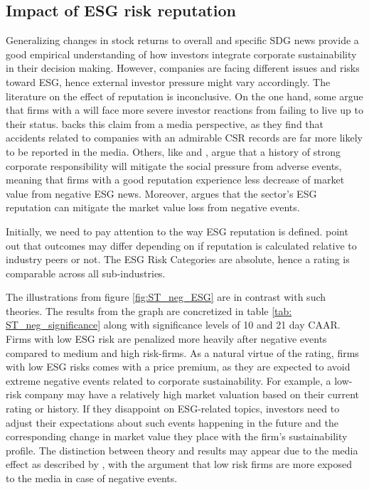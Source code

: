\subsection{Impact of ESG risk reputation}

Generalizing changes in stock returns to overall and specific SDG news provide a good empirical understanding of how investors integrate corporate sustainability in their decision making. However, companies are facing different issues and risks toward ESG, hence external investor pressure might vary accordingly. 
The literature on the effect of reputation is inconclusive. On the one hand, some argue that firms with a  will face more severe investor reactions from failing to live up to their status. \cite{noNewsgoodnews} backs this claim from a media perspective, as they find that accidents related to companies with an admirable CSR records are far more likely to be reported in the media. Others, like \cite{flammer2013corporate} and \cite{godfrey2009relationship}, argue that a history of strong corporate responsibility will mitigate the social pressure from adverse events, meaning that firms with a good reputation experience less decrease of market value from negative ESG news. Moreover, \cite{Blancard_ESG_sentiment} argues that the sector's ESG reputation can mitigate the market value loss from negative events.  

Initially, we need to pay attention to the way ESG reputation is defined. \cite{rennings2007effect} point out that outcomes may differ depending on if reputation is calculated relative to industry peers or not. The ESG Risk Categories are absolute, hence a rating is comparable across all sub-industries. 

The illustrations from figure \ref{fig:ST_neg_ESG} are in contrast with such theories. The results from the graph are concretized in table \ref{tab: ST_neg_significance} along with significance levels of 10 and 21 day CAAR. Firms with low ESG risk are penalized more heavily after negative events compared to medium and high risk-firms. As a natural virtue of the rating, firms with low ESG risks comes with a price premium, as they are expected to avoid extreme negative events related to corporate sustainability. For example, a low-risk company may have a relatively high market valuation based on their current rating or history. If they disappoint on ESG-related topics, investors need to adjust their expectations about such events happening in the future and the corresponding change in market value they place with the firm's sustainability profile. The distinction between theory and results may appear due to the media effect as described by \cite{noNewsgoodnews}, with the argument that low risk firms are more exposed to the media in case of negative events. 

